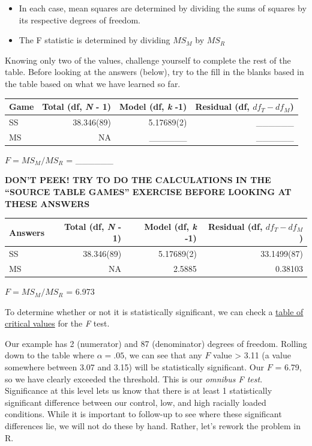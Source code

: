 \documentclass[
  english,
]{book}
\providecommand{\tightlist}{%
  \setlength{\itemsep}{0pt}\setlength{\parskip}{0pt}}
\begin{document}
\begin{itemize}
\tightlist
\item
  In each case, mean squares are determined by dividing the sums of squares by its respective degrees of freedom.
\item
  The F statistic is determined by dividing \(MS_M\) by \(MS_R\)
\end{itemize}

Knowing only two of the values, challenge yourself to complete the rest of the table. Before looking at the answers (below), try to the fill in the blanks based in the table based on what we have learned so far.

\begin{longtable}[]{@{}lrrr@{}}
\toprule
Game & Total (df, \emph{N} - 1) & Model (df, \emph{k} -1) & Residual (df, \(df_T - df_M\))\tabularnewline
\midrule
\endhead
SS & 38.346(89) & 5.17689(2) & \_\_\_\_\_\_\tabularnewline
MS & NA & \_\_\_\_\_\_ & \_\_\_\_\_\_\tabularnewline
\bottomrule
\end{longtable}

\(F = MS_{M}/MS_{R}\) = \_\_\_\_\_\_

\textbf{DON'T PEEK! TRY TO DO THE CALCULATIONS IN THE ``SOURCE TABLE GAMES'' EXERCISE BEFORE LOOKING AT THESE ANSWERS}

\begin{longtable}[]{@{}lrrr@{}}
\toprule
Answers & Total (df, \emph{N} - 1) & Model (df, \emph{k} -1) & Residual (df, \(df_T - df_M\))\tabularnewline
\midrule
\endhead
SS & 38.346(89) & 5.17689(2) & 33.1499(87)\tabularnewline
MS & NA & 2.5885 & 0.38103\tabularnewline
\bottomrule
\end{longtable}

\(F = MS_{M}/MS_{R}\) = 6.973

To determine whether or not it is statistically significant, we can check a \href{https://www.statology.org/how-to-read-the-f-distribution-table/}{table of critical values} \citep{zach_how_2019} for the \emph{F} test.

Our example has 2 (numerator) and 87 (denominator) degrees of freedom. Rolling down to the table where \(\alpha = .05\), we can see that any \(F\) value \textgreater{} 3.11 (a value somewhere between 3.07 and 3.15) will be statistically significant. Our \(F\) = 6.79, so we have clearly exceeded the threshold. This is our \emph{omnibus F test}. Significance at this level lets us know that there is at least 1 statistically significant difference between our control, low, and high racially loaded conditions. While it is important to follow-up to see where these significant differences lie, we will not do these by hand. Rather, let's rework the problem in R.
\end{document}
